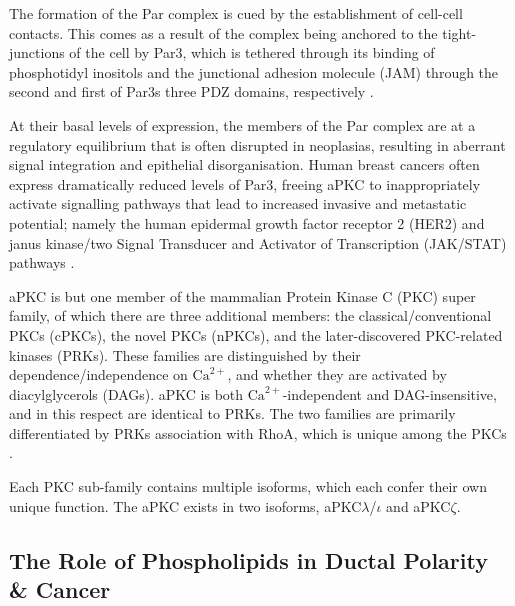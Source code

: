 The formation of the Par complex is cued by the establishment of cell-cell
contacts. This comes as a result of the complex being anchored to the tight-
junctions of the cell by Par3, which is tethered through its binding of
phosphotidyl inositols and the junctional adhesion molecule (JAM) through the
second and first of Par3s three PDZ domains, respectively \citep{wu2007,ebnet2001}.\par

At their basal levels of expression, the members of the Par complex are at a
regulatory equilibrium that is often disrupted in neoplasias, resulting in
aberrant signal integration and epithelial disorganisation. Human breast
cancers often express dramatically reduced levels of Par3, freeing aPKC to
inappropriately activate signalling pathways that lead to increased invasive and
metastatic potential; namely the human epidermal growth factor receptor 2 (HER2)
and janus kinase/two Signal Transducer and Activator of Transcription (JAK/STAT)
pathways \citep{xue2013,mccaffrey2012}.\par

aPKC is but one member of the mammalian Protein Kinase C (PKC) super family, of
which there are three additional members: the classical/conventional PKCs
(cPKCs), the novel PKCs (nPKCs), and the later-discovered PKC-related kinases
(PRKs). These families are distinguished by their dependence/independence
on $\textrm{Ca}^{2+}$, and whether they are activated by diacylglycerols (DAGs). aPKC is both $\textrm{Ca}^{2+}$-independent and DAG-insensitive, and in this respect are identical to PRKs.
The two families are primarily differentiated by PRKs association with RhoA,
which is unique among the PKCs \citep{mellor1998}.\par

Each PKC sub-family contains multiple isoforms, which each confer their own
unique function. The aPKC exists in two isoforms, aPKC$\lambda$/$\iota$ and aPKC$\zeta$.\par

\subsection{The Role of Phospholipids in Ductal Polarity \& Cancer}
